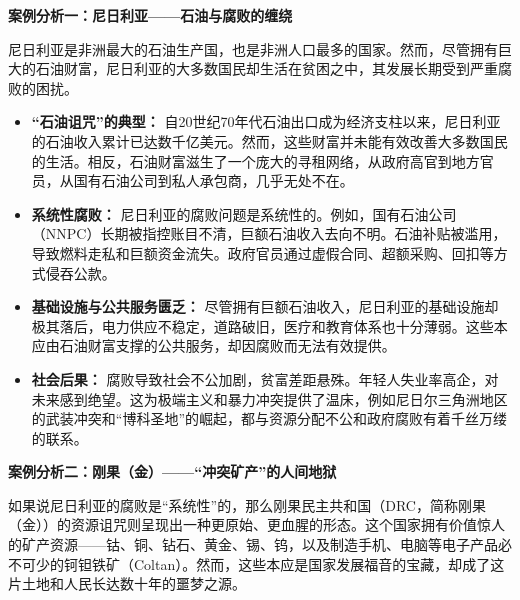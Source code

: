 \textbf{案例分析一：尼日利亚——石油与腐败的缠绕}

尼日利亚是非洲最大的石油生产国，也是非洲人口最多的国家。然而，尽管拥有巨大的石油财富，尼日利亚的大多数国民却生活在贫困之中，其发展长期受到严重腐败的困扰。

\begin{itemize}
    \item \textbf{“石油诅咒”的典型：} 自20世纪70年代石油出口成为经济支柱以来，尼日利亚的石油收入累计已达数千亿美元。然而，这些财富并未能有效改善大多数国民的生活。相反，石油财富滋生了一个庞大的寻租网络，从政府高官到地方官员，从国有石油公司到私人承包商，几乎无处不在。
    \item \textbf{系统性腐败：} 尼日利亚的腐败问题是系统性的。例如，国有石油公司（NNPC）长期被指控账目不清，巨额石油收入去向不明。石油补贴被滥用，导致燃料走私和巨额资金流失。政府官员通过虚假合同、超额采购、回扣等方式侵吞公款。
    \item \textbf{基础设施与公共服务匮乏：} 尽管拥有巨额石油收入，尼日利亚的基础设施却极其落后，电力供应不稳定，道路破旧，医疗和教育体系也十分薄弱。这些本应由石油财富支撑的公共服务，却因腐败而无法有效提供。
    \item \textbf{社会后果：} 腐败导致社会不公加剧，贫富差距悬殊。年轻人失业率高企，对未来感到绝望。这为极端主义和暴力冲突提供了温床，例如尼日尔三角洲地区的武装冲突和“博科圣地”的崛起，都与资源分配不公和政府腐败有着千丝万缕的联系。
\end{itemize}

\textbf{案例分析二：刚果（金）——“冲突矿产”的人间地狱}

如果说尼日利亚的腐败是“系统性”的，那么刚果民主共和国（DRC，简称刚果（金））的资源诅咒则呈现出一种更原始、更血腥的形态。这个国家拥有价值惊人的矿产资源——钴、铜、钻石、黄金、锡、钨，以及制造手机、电脑等电子产品必不可少的钶钽铁矿（Coltan）。然而，这些本应是国家发展福音的宝藏，却成了这片土地和人民长达数十年的噩梦之源。

